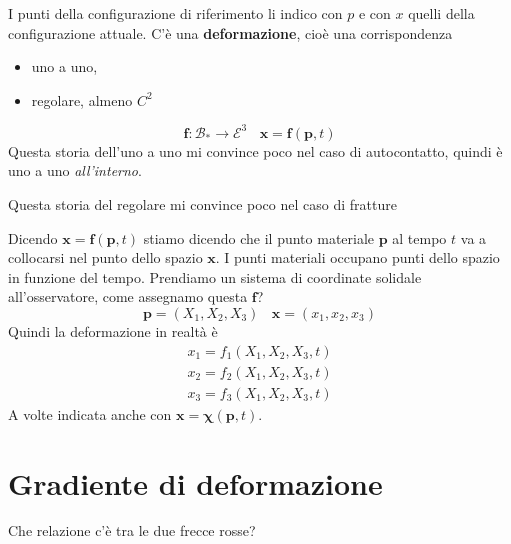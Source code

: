 \documentclass[10pt,a4paper,twoside]{book}
\begin{document}
I punti della configurazione di riferimento li indico con $p$ e con $x$ quelli della configurazione attuale. C'è una \textbf{deformazione}, cioè una corrispondenza
\begin{itemize}
\item uno a uno, 
\item regolare, almeno $C^{2}$
\end{itemize}
\begin{equation*}
\mathbf{f} :\mathcal{B}_{*}\rightarrow \mathcal{E}^{3} \ \ \ \ \mathbf{x} =\mathbf{f}(\mathbf{p} ,t)
\end{equation*}
Questa storia dell'uno a uno mi convince poco nel caso di autocontatto, quindi è uno a uno \textit{all'interno}.


Questa storia del regolare mi convince poco nel caso di fratture


Dicendo $\mathbf{x} =\mathbf{f}(\mathbf{p} ,t)$ stiamo dicendo che il punto materiale $\mathbf{p}$ al tempo $t$ va a collocarsi nel punto dello spazio $\mathbf{x}$. I punti materiali occupano punti dello spazio in funzione del tempo. Prendiamo un sistema di coordinate solidale all'osservatore, come assegnamo questa $\mathbf{f}$?
\begin{equation*}
\mathbf{p} =( X_{1} ,X_{2} ,X_{3}) \ \ \ \ \mathbf{x} =( x_{1} ,x_{2} ,x_{3})
\end{equation*}
Quindi la deformazione in realtà è
\begin{gather*}
x_{1} =f_{1}( X_{1} ,X_{2} ,X_{3} ,t)\\
x_{2} =f_{2}( X_{1} ,X_{2} ,X_{3} ,t)\\
x_{3} =f_{3}( X_{1} ,X_{2} ,X_{3} ,t)
\end{gather*}
A volte indicata anche con $\mathbf{x} =\mathbf{\chi }(\mathbf{p} ,t)$.
\section{Gradiente di deformazione}

Che relazione c'è tra le due frecce rosse?

\end{document}
